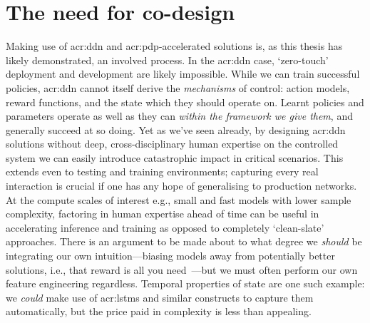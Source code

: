 \section{The need for co-design}
Making use of \gls{acr:ddn} and \gls{acr:pdp}-accelerated solutions is, as this thesis has likely demonstrated, an involved process.
In the \gls{acr:ddn} case, `zero-touch' deployment and development are likely impossible.
While we can train successful policies, \gls{acr:ddn} cannot itself derive the \emph{mechanisms} of control: action models, reward functions, and the state which they should operate on.
Learnt policies and parameters operate as well as they can \emph{within the framework we give them}, and generally succeed at so doing.
Yet as we've seen already, by designing \gls{acr:ddn} solutions without deep, cross-disciplinary human expertise on the controlled system we can easily introduce catastrophic impact in critical scenarios.
This extends even to testing and training environments; capturing every real interaction is crucial if one has any hope of generalising to production networks.
At the compute scales of interest e.g., small and fast models with lower sample complexity, factoring in human expertise ahead of time can be useful in accelerating inference and training as opposed to completely `clean-slate' approaches.
There is an argument to be made about to what degree we \emph{should} be integrating our own intuition---biasing models away from potentially better solutions, i.e., that reward is all you need~\parencite{DBLP:journals/ai/SilverSPS21}---but we must often perform our own feature engineering regardless.
Temporal properties of state are one such example: we \emph{could} make use of \glspl{acr:lstm} and similar constructs to capture them automatically, but the price paid in complexity is less than appealing.
%
%

